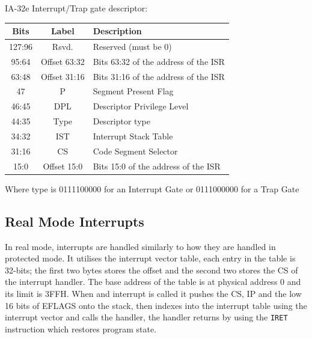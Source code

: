 \documentclass{article}
\newcommand{\layout}[1]{\parbox{\linewidth}{#1}}
\begin{document}
\layout{
  IA-32e Interrupt/Trap gate descriptor:
  \begin{table}[H]
    \centering
    \begin{tabular}{|c|c|l|}
      \hline \textbf{Bits} & \textbf{Label} & \textbf{Description} \\ \hline
      127:96 & Rsvd. & Reserved (must be 0) \\
      95:64 & Offset 63:32 & Bits 63:32 of the address of the ISR \\
      63:48 & Offset 31:16 & Bits 31:16 of the address of the ISR \\
      47 & P & Segment Present Flag \\
      46:45 & DPL & Descriptor Privilege Level \\
      44:35 & Type & Descriptor type \\
      34:32 & IST & Interrupt Stack Table \\
      31:16 & CS & Code Segment Selector \\
      15:0 & Offset 15:0 & Bits 15:0 of the address of the ISR \\ \hline
    \end{tabular}
  \end{table}

  Where type is 0111100000 for an Interrupt Gate or 0111000000 for a Trap Gate

  \bigskip \cite[Chapter~7.14]{sdm3} \cite[Chapter~3.5]{sdm3}
}

\layout{
  \subsection{Real Mode Interrupts}

  In real mode, interrupts are handled similarly to how they are handled in protected mode.
  It utilises the interrupt vector table, each entry in the table is 32-bits;
  the first two bytes stores the offset and the second two stores the CS of the interrupt handler.
  The base address of the table is at physical address 0 and its limit is 3FFH.
  When and interrupt is called it pushes the CS, IP and the low 16 bits of EFLAGS onto the stack, then indexes into the interrupt table using the interrupt vector and calls the handler, the handler returns by using the \texttt{IRET} instruction which restores program state.

  \bigskip \cite[22.1.4]{sdm3}
}
\end{document}
